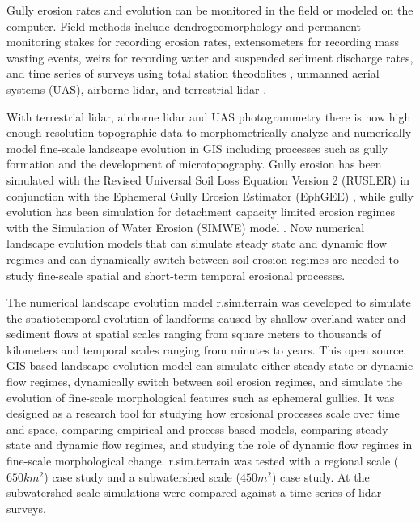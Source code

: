 \documentclass[final,3p,times,twocolumn]{elsarticle}
\begin{document}
Gully erosion rates and evolution
can be monitored in the field 
or modeled on the computer. 
Field methods include
dendrogeomorphology \cite{Malik2008} and 
permanent monitoring stakes for recording erosion rates, 
extensometers for recording mass wasting events, 
weirs for recording water and suspended sediment discharge rates, 
and time series of surveys using 
total station theodolites \cite{Thomas2004},
unmanned aerial systems (UAS),
airborne lidar, and terrestrial lidar \cite{Starek2011,Bechet2016}.

With terrestrial lidar, airborne lidar and 
UAS photogrammetry
there is now high enough resolution topographic data 
to morphometrically analyze and 
numerically model fine-scale landscape evolution in GIS
including processes such as gully formation 
and the development of microtopography. 
Gully erosion has been simulated with 
the Revised Universal Soil Loss Equation Version 2 (RUSLER)
in conjunction with the Ephemeral Gully Erosion Estimator (EphGEE)
\cite{Dabney2014},
while gully evolution
has been simulation for detachment capacity limited erosion regimes
with the Simulation of Water Erosion (SIMWE) model
\cite{Koco2011, Mitasova2013}. 
Now numerical landscape evolution models 
that can simulate 
steady state and dynamic flow regimes
and can dynamically switch between soil erosion regimes 
are needed to study 
fine-scale spatial and short-term temporal erosional processes.


The numerical landscape evolution model 
\lowercase{r.sim.terrain} was developed to 
simulate the spatiotemporal evolution of landforms
caused by shallow overland water and sediment flows
at spatial scales ranging from
square meters to thousands of kilometers
and temporal scales ranging from minutes to years. 
This open source, GIS-based landscape evolution model can
simulate either steady state or dynamic flow regimes, 
dynamically switch between soil erosion regimes, and
simulate the evolution of fine-scale morphological features 
such as ephemeral gullies.
It was designed as a research tool for
studying how erosional processes scale over time and space,
comparing empirical and process-based models, 
comparing steady state and dynamic flow regimes, and
studying the role of dynamic flow regimes in fine-scale morphological change. 
\lowercase{r.sim.terrain} was tested with a regional scale ($650 km^{2}$) case study
and a subwatershed scale ($450 m^{2}$) case study. 
At the subwatershed scale simulations were compared against 
a time-series of lidar surveys.
\end{document}
